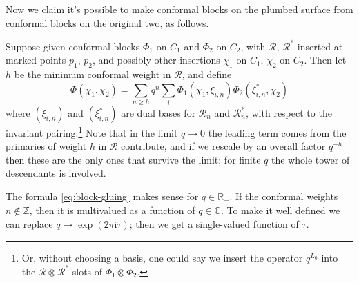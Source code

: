 \documentclass[12pt,letterpaper,reqno]{amsart}
\numberwithin{equation}{section}
\newcommand{\bbR}{\ensuremath{\mathbb R}}
\newcommand{\bbC}{\ensuremath{\mathbb C}}
\newcommand{\bbZ}{\ensuremath{\mathbb Z}}
\newcommand{\I}{{\mathrm i}}
\newcommand{\vrep}{\mathcal{R}}
\begin{document}
Now we claim it's possible to make conformal blocks on the plumbed surface from conformal blocks on the original two,
as follows. 

Suppose given conformal blocks $\Phi_1$ on $C_1$ and $\Phi_2$ on $C_2$, with $\vrep$, $\vrep^*$ inserted at
marked points $p_1$, $p_2$, and possibly 
other insertions $\chi_1$ on $C_1$, $\chi_2$ on $C_2$.
Then let $h$ be the minimum conformal weight in $\vrep$, and define
\begin{equation} \label{eq:block-gluing}
  \Phi(\chi_1, \chi_2) = \sum_{n \ge h} q^{n} \sum_i \Phi_1(\chi_1, \xi_{i,n}) \Phi_2(\xi^*_{i,n}, \chi_2)
\end{equation}
where $(\xi_{i,n})$ and $(\xi^*_{i,n})$ are dual bases for $\vrep_n$ and $\vrep^*_n$, with respect to the invariant pairing.\footnote{Or, without choosing a basis, 
one could say we insert the operator $q^{L_0}$ into
the $\vrep \otimes \vrep^*$ slots of $\Phi_1 \otimes \Phi_2$.}
Note that in the limit $q \to 0$ the leading term comes from the 
primaries of weight $h$ in $\vrep$ contribute, and if we rescale by an overall factor $q^{-h}$ then these
are the only ones that survive the limit; for finite $q$ the whole
tower of descendants is involved.

The formula \eqref{eq:block-gluing} makes sense for $q \in \bbR_{+}$.
If the conformal weights $n \notin \bbZ$, then 
it is multivalued as a function of $q \in \bbC$. 
To make it well defined we can 
replace $q \to \exp(2 \pi \I \tau)$;
then we get a single-valued function of $\tau$.
\end{document}
